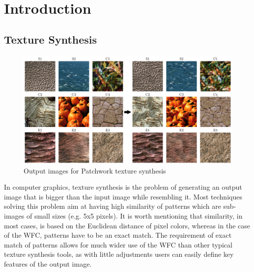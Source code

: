 \documentclass[shortabstract, english, inz]{iithesis}
\author         {Krzysztof Sławik}
\date          {03.02.2023}                     %
\begin{document}

\chapter{Introduction}
\section{Texture Synthesis}
\begin{figure}[H]
\centering
\includegraphics[width=1\textwidth, angle=0]{images/texsynth_input_output.png}
\caption{Output images for Patchwork texture synthesis \cite{harrison2002patchwork}}
\label{fig:texSynth}
\end{figure}
In computer graphics, texture synthesis is the problem of generating an output image that is bigger than the input image while resembling it. Most techniques solving this problem aim at having high similarity of patterns which are sub-images of small sizes (e.g. 5x5 pixels). It is worth mentioning that similarity, in most cases, is based on the Euclidean distance of pixel colors, whereas in the case of the WFC, patterns have to be an exact match. \cite{Smith}
The requirement of exact match of patterns allows for much wider use of the WFC than other typical texture synthesis tools, as with little adjustments users can easily define key features of the output image. \cite{GraphBased}
\end{document}
